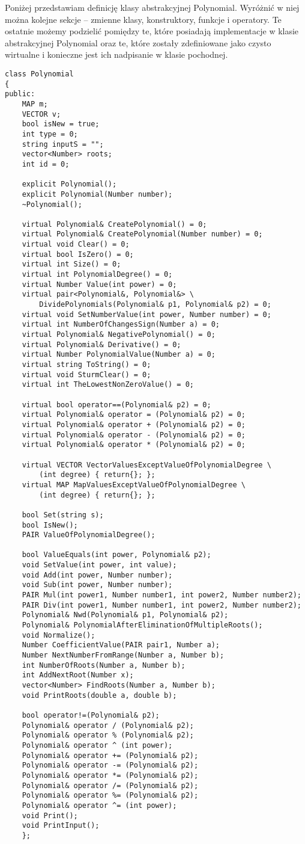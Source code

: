 \documentclass[twoside,a4paper]{book}
\begin{document}
Poniżej przedstawiam definicję klasy abstrakcyjnej Polynomial. Wyróżnić w niej można kolejne sekcje -- zmienne klasy, konstruktory, funkcje i operatory. Te ostatnie możemy podzielić pomiędzy te, które posiadają implementacje w klasie abstrakcyjnej Polynomial oraz te, które zostały zdefiniowane jako czysto wirtualne i konieczne jest ich nadpisanie w klasie pochodnej.

\begin{lstlisting}
class Polynomial
{
public:
	MAP m;
	VECTOR v;
	bool isNew = true;
	int type = 0;
	string inputS = "";
	vector<Number> roots;
	int id = 0;
	
	explicit Polynomial();
	explicit Polynomial(Number number);
	~Polynomial();
	
	virtual Polynomial& CreatePolynomial() = 0;
	virtual Polynomial& CreatePolynomial(Number number) = 0;
	virtual void Clear() = 0;
	virtual bool IsZero() = 0;
	virtual int Size() = 0;
	virtual int PolynomialDegree() = 0;
	virtual Number Value(int power) = 0;
	virtual pair<Polynomial&, Polynomial&> \
		DividePolynomials(Polynomial& p1, Polynomial& p2) = 0;
	virtual void SetNumberValue(int power, Number number) = 0;
	virtual int NumberOfChangesSign(Number a) = 0;
	virtual Polynomial& NegativePolynomial() = 0;
	virtual Polynomial& Derivative() = 0;
	virtual Number PolynomialValue(Number a) = 0;
	virtual string ToString() = 0;
	virtual void SturmClear() = 0;
	virtual int TheLowestNonZeroValue() = 0;
	
	virtual bool operator==(Polynomial& p2) = 0;
	virtual Polynomial& operator = (Polynomial& p2) = 0;
	virtual Polynomial& operator + (Polynomial& p2) = 0;
	virtual Polynomial& operator - (Polynomial& p2) = 0;
	virtual Polynomial& operator * (Polynomial& p2) = 0;
	
	virtual VECTOR VectorValuesExceptValueOfPolynomialDegree \
		(int degree) { return{}; };
	virtual MAP MapValuesExceptValueOfPolynomialDegree \
		(int degree) { return{}; };
	
	bool Set(string s);
	bool IsNew();
	PAIR ValueOfPolynomialDegree();
	
	bool ValueEquals(int power, Polynomial& p2);
	void SetValue(int power, int value);
	void Add(int power, Number number);
	void Sub(int power, Number number);
	PAIR Mul(int power1, Number number1, int power2, Number number2);
	PAIR Div(int power1, Number number1, int power2, Number number2);
	Polynomial& Nwd(Polynomial& p1, Polynomial& p2);
	Polynomial& PolynomialAfterEliminationOfMultipleRoots();
	void Normalize();
	Number CoefficientValue(PAIR pair1, Number a);
	Number NextNumberFromRange(Number a, Number b);
	int NumberOfRoots(Number a, Number b);
	int AddNextRoot(Number x);
	vector<Number> FindRoots(Number a, Number b);
	void PrintRoots(double a, double b);
	
	bool operator!=(Polynomial& p2);
	Polynomial& operator / (Polynomial& p2);
	Polynomial& operator % (Polynomial& p2);
	Polynomial& operator ^ (int power);
	Polynomial& operator += (Polynomial& p2);
	Polynomial& operator -= (Polynomial& p2);
	Polynomial& operator *= (Polynomial& p2);
	Polynomial& operator /= (Polynomial& p2);
	Polynomial& operator %= (Polynomial& p2);
	Polynomial& operator ^= (int power);
	void Print();
	void PrintInput();
	};
\end{lstlisting}
\end{document}
